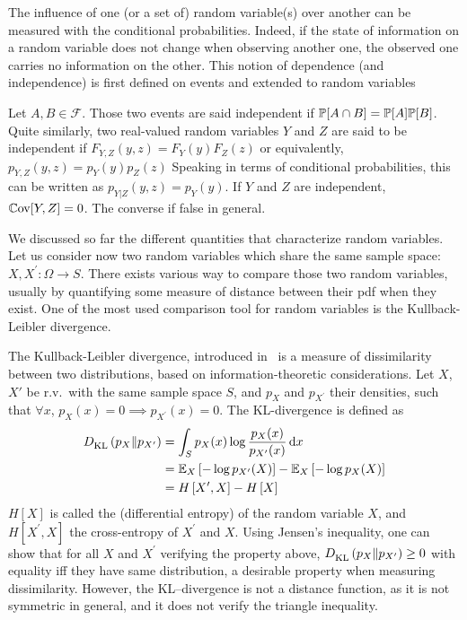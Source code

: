 \documentclass[../../Main_ManuscritThese.tex]{subfiles}
\begin{document}
The influence of one (or a set of) random variable(s) over another can be measured with the conditional probabilities. Indeed, if the state of information on a random variable does not change when observing another one, the observed one carries no information on the other. This notion of dependence (and independence) is first defined on events and extended to random variables
\begin{definition}[Independence]
  Let $A,B\in \mathcal{F}$. Those two events are said independent if $\mathbb{P}[A \cap B] = \mathbb{P}[A]\mathbb{P}[B]$.
  Quite similarly, two real-valued random variables $Y$ and $Z$ are said to be independent if $F_{Y,Z}(y,z) = F_Y(y) F_Z(z)$ or equivalently, $p_{Y,Z}(y,z) = p_Y(y) p_Z(z)$
  Speaking in terms of conditional probabilities, this can be written as $p_{Y|Z}(y,z) = p_{Y}(y)$.
  If $Y$ and $Z$ are independent, $\mathbb{C}\mathrm{ov}[Y, Z] = 0$. The converse if false in general.
\end{definition}

We discussed so far the different quantities that characterize random variables. Let us consider now two random variables which share the same sample space: $X, X^{\prime}: \Omega \rightarrow S$. There exists various way to compare those two random variables, usually by quantifying some measure of distance between their pdf when they exist. One of the most used comparison tool for random variables is the Kullback-Leibler divergence.

\begin{definition}
  The Kullback-Leibler divergence, introduced in~\cite{kullback_information_1951} is a measure of dissimilarity between two distributions, based on information-theoretic considerations.
  Let $X$, $X'$ be r.v.\ with the same sample space $S$, and $p_X$ and $p_{X^{\prime}}$ their densities, such that $\forall x$, $p_X(x) = 0 \implies p_{X^{\prime}}(x) =0$. The KL-divergence is defined as
  \begin{align}
    D^{\mathrm{}}_{\mathrm{KL}}\left(p_X \| p_{X^\prime}\right) &= \int_{S} p_X(x) \log \frac{p_X(x)}{p_{X^\prime}(x)} \,\mathrm{d}x \\ &= \mathbb{E}_X\left[-\log p_{X^\prime}(X)\right] - \mathbb{E}_X\left[-\log p_X(X)\right] \\
                                                                                                &= H\left[X^{\prime}, X\right] - H\left[X\right]
  \end{align}
  $H[X]$ is called the (differential entropy) of the random variable $X$, and $H[X^{\prime}, X]$ the cross-entropy of $X^{\prime}$ and $X$.
  Using Jensen's inequality, one can show that for all $X$ and $X^{\prime}$ verifying the property above, $D^{\mathrm{}}_{\mathrm{KL}}\left(p_X \| p_{X^{\prime}}\right)\geq 0$ with equality iff they have same distribution, a desirable property when measuring dissimilarity. However, the KL--divergence is not a distance function, as it is not symmetric in general, and it does not verify the triangle inequality.
\end{definition}
\end{document}
